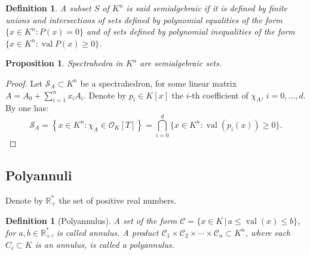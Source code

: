 \documentclass[a4paper,oneside,10pt]{article}
\newtheorem{proposition}[theorem]{Proposition}
\newtheorem{definition}[theorem]{Definition}
\newcommand{\R}{\mathbb{R}} %
\newcommand{\corentin}[1]{{\color{red} #1}} %
\DeclareMathOperator{\val}{val}
\newcommand{\OK}{\mathcal{O}_K}
\begin{document}
\begin{definition}
  A subset $S$ of $K^n$ is said \emph{semialgebraic} if it is defined by finite unions and intersections of sets defined by polynomial equalities of the form $\{ x \in K^n  : P( x) = 0 \}$ and of sets defined by polynomial inequalities of the form $\{ x\in K^n : \val P(x) \geq 0 \}$.
\end{definition}

\begin{proposition}
  Spectrahedra in $K^n$ are semialgebraic sets. 
\end{proposition}
\begin{proof}
  Let $\mathcal{S}_A \subset K^n$ be a spectrahedron, for some linear matrix $A = A_0+\sum_{i=1}^n x_i A_i$. 
  Denote by $p_i \in K[x]$ the $i$-th coefficient of $\chi_{A}$, $i=0,\ldots,d$.
  By  one has:
  $$
  \mathcal{S}_A = \left\{x \in K^n : \chi_{A} \in \OK[T]\right\}
  = \bigcap_{i=0}^d \{x \in K^n : \val(p_i(x)) \geq 0\}.
  $$
\end{proof}


\subsection{Polyannuli}

Denote by $\R^*_+$ the set of positive real numbers.

\begin{definition}[Polyannulus]\label{def_annuli}
  A set of the form $\mathcal{C} = \{x \in K \,|\, a \le \val(x) \le b\}$, for $a,b \in \R^*_+$,
  is called \emph{annulus}. A product $\mathcal{C}_1 \times \mathcal{C}_2 \times \cdots \times \mathcal{C}_n \subset K^n$,
  where each $C_i \subset K$ is an annulus, is called a \emph{polyannulus}.
\end{definition}
\end{document}

